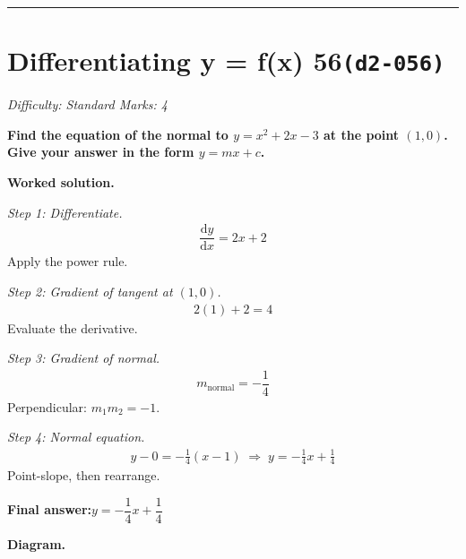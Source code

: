 \documentclass[11pt]{article}
\newcommand{\question}[1]{\par\medskip\noindent\textbf{#1}\par}
\begin{document}
\medskip\hrule

\section*{Differentiating y = f(x) 56\quad\small\texttt{(d2-056)}}
\textit{Difficulty: Standard \quad\textbar\quad Marks: 4}

\question{Find the equation of the normal to \( y = x^2 + 2x - 3 \) at the point \( (1, 0) \). Give your answer in the form \( y = mx + c \).}

\textbf{Worked solution.}

\textit{Step 1: Differentiate.}
\[\begin{gathered}
\dfrac{\mathrm{d}y}{\mathrm{d}x} = 2x + 2
\end{gathered}\]
Apply the power rule.

\textit{Step 2: Gradient of tangent at \( (1,0) \).}
\[\begin{gathered}
2(1) + 2 = 4
\end{gathered}\]
Evaluate the derivative.

\textit{Step 3: Gradient of normal.}
\[\begin{gathered}
m_{\text{normal}} = -\dfrac{1}{4}
\end{gathered}\]
Perpendicular: \( m_1 m_2 = -1 \).

\textit{Step 4: Normal equation.}
\[\begin{gathered}
y - 0 = -\tfrac{1}{4}(x - 1) \;\Rightarrow\; y = -\tfrac{1}{4}x + \tfrac{1}{4}
\end{gathered}\]
Point-slope, then rearrange.

\begin{answerbox}
\textbf{Final answer:}\quad \(\displaystyle  y = -\dfrac{1}{4}x + \dfrac{1}{4} \)
\end{answerbox}
\textbf{Diagram.}
\end{document}
